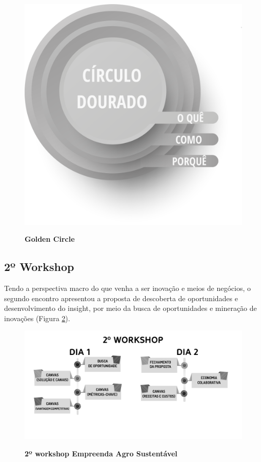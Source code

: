 \begin{figure}[H]
\centering
\caption{\textbf{Golden Circle}}
\includegraphics[scale=0.25]{Imagens/circulo_dourado.png}
\label{figura_5}
\end{figure}

\subsection{2º Workshop}

Tendo a perspectiva macro do que venha a ser inovação e meios de negócios, o segundo encontro apresentou a proposta de descoberta de oportunidades e desenvolvimento do insight, por meio da busca de oportunidades e mineração de inovações (Figura \ref{figura_31}).





\begin{figure}[H]
\centering
\caption{\textbf{2º workshop Empreenda Agro Sustentável}}
\includegraphics[scale=0.4]{Imagens/workshop-02.png}
\label{figura_31}
\end{figure}

